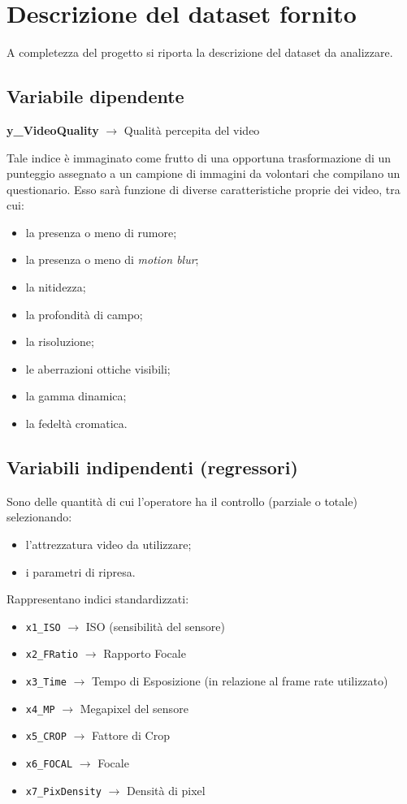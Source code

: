 \section{Descrizione del dataset fornito}
A completezza del progetto si riporta la descrizione del dataset da analizzare.

\subsection*{Variabile dipendente}
\textbf{y\_VideoQuality} \quad $\rightarrow$ \quad Qualità percepita del video

Tale indice è immaginato come frutto di una opportuna trasformazione di un punteggio assegnato a un campione di immagini da volontari che compilano un questionario. Esso sarà funzione di diverse caratteristiche proprie dei video, tra cui:

\begin{itemize}
	\item la presenza o meno di rumore;
	\item la presenza o meno di \textit{motion blur};
	\item la nitidezza;
	\item la profondità di campo;
	\item la risoluzione;
	\item le aberrazioni ottiche visibili;
	\item la gamma dinamica;
	\item la fedeltà cromatica.
\end{itemize}

\subsection*{Variabili indipendenti (regressori)}

Sono delle quantità di cui l’operatore ha il controllo (parziale o totale) selezionando:

\begin{itemize}
	\item l’attrezzatura video da utilizzare;
	\item i parametri di ripresa.
\end{itemize}

Rappresentano indici standardizzati:

\begin{itemize}
	\item \texttt{x1\_ISO} \quad $\rightarrow$ \quad ISO (sensibilità del sensore)
	\item \texttt{x2\_FRatio} \quad $\rightarrow$ \quad Rapporto Focale
	\item \texttt{x3\_Time} \quad $\rightarrow$ \quad Tempo di Esposizione (in relazione al frame rate utilizzato)
	\item \texttt{x4\_MP} \quad $\rightarrow$ \quad Megapixel del sensore
	\item \texttt{x5\_CROP} \quad $\rightarrow$ \quad Fattore di Crop
	\item \texttt{x6\_FOCAL} \quad $\rightarrow$ \quad Focale
	\item \texttt{x7\_PixDensity} \quad $\rightarrow$ \quad Densità di pixel
\end{itemize}


